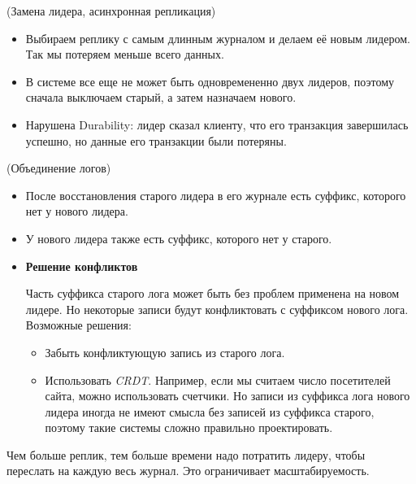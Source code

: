 \begin{algorithm}(Замена лидера, асинхронная репликация)
    \begin{itemize}
        \item Выбираем реплику с самым длинным журналом и делаем её новым лидером. Так мы потеряем меньше всего данных.
        \item В системе все еще не может быть одновремененно двух лидеров, поэтому сначала выключаем старый, а затем назначаем нового.
        \item Нарушена Durability: лидер сказал клиенту, что его транзакция завершилась успешно, но данные его транзакции были потеряны.
    \end{itemize}

\end{algorithm}

\begin{algorithm}(Объединение логов)
    \begin{itemize}
        \item После восстановления старого лидера в его журнале есть суффикс, которого нет у нового лидера.
        \item У нового лидера также есть суффикс, которого нет у старого.

        \item \textbf{Решение конфликтов}

        Часть суффикса старого лога может быть без проблем применена на новом лидере. Но некоторые записи будут конфликтовать с суффиксом нового лога. Возможные решения:
        \begin{itemize}
            \item Забыть конфликтующую запись из старого лога.
            \item Использовать \textit{CRDT}. Например, если мы считаем число посетителей сайта, можно использовать счетчики. Но записи из суффикса лога нового лидера иногда не имеют смысла без записей из суффикса старого, поэтому такие системы сложно правильно проектировать.
        \end{itemize}

    \end{itemize}

\end{algorithm}

\begin{remark}
    Чем больше реплик, тем больше времени надо потратить лидеру, чтобы переслать на каждую весь журнал. Это ограничивает масштабируемость.
\end{remark}

